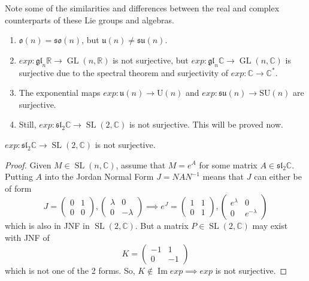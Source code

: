 \documentclass{article}
\DeclareMathOperator{\im}{Im}
\DeclareMathOperator{\GL}{GL}
\DeclareMathOperator{\SL}{SL}
\begin{document}
      Note some of the similarities and differences between the real and complex counterparts of these Lie groups and algebras. 
      \begin{enumerate}
        \item $\mathfrak{o}(n) = \mathfrak{so}(n)$, but $\mathfrak{u}(n) \neq \mathfrak{su}(n)$. 
        \item $exp: \mathfrak{gl}_n \mathbb{R} \longrightarrow \GL(n, \mathbb{R})$ is not surjective, but $exp: \mathfrak{gl}_n \mathbb{C} \longrightarrow \GL(n, \mathbb{C})$ is surjective due to the spectral theorem and surjectivity of $exp: \mathbb{C} \longrightarrow \mathbb{C}^*$.
        \item The exponential maps $exp: \mathfrak{u}(n) \longrightarrow \text{U}(n)$ and $exp: \mathfrak{su}(n) \longrightarrow \text{SU}(n)$ are surjective. 
        \item Still, $exp: \mathfrak{sl}_2 \mathbb{C} \longrightarrow \SL(2, \mathbb{C})$ is not surjective. This will be proved now. 
      \end{enumerate}

      \begin{theorem}
        $exp: \mathfrak{sl}_2 \mathbb{C} \longrightarrow \SL(2, \mathbb{C})$ is not surjective. 
      \end{theorem}
      \begin{proof}
        Given $M \in \SL(n, \mathbb{C})$, assume that $M = e^A$ for some matrix $A \in \mathfrak{sl}_2 \mathbb{C}$. Putting $A$ into the Jordan Normal Form $J = N A N^{-1}$ means that $J$ can either be of form
        \begin{equation}
          J = \begin{pmatrix}
          0&1\\0&0
          \end{pmatrix}, \begin{pmatrix}
          \lambda&0\\0&-\lambda
          \end{pmatrix} \implies e^J = \begin{pmatrix}
          1&1\\0&1
          \end{pmatrix}, \begin{pmatrix}
          e^\lambda&0\\0&e^{-\lambda}
          \end{pmatrix}
        \end{equation}
        which is also in JNF in $\SL(2, \mathbb{C})$. But a matrix $P \in \SL(2, \mathbb{C})$ may exist with JNF of 
        \begin{equation}
          K = \begin{pmatrix}
          -1&1\\0&-1
          \end{pmatrix}
        \end{equation}
        which is not one of the 2 forms. So, $K \not\in \im{exp} \implies exp$ is not surjective. 
      \end{proof}
\end{document}
